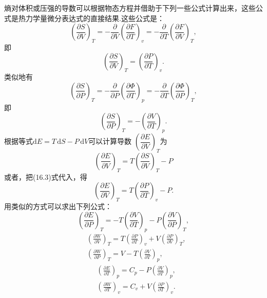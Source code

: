 熵对体积或压强的导数可以根据物态方程并借助于下列一些公式计算出来，这些公式是热力学量微分表达式的直接结果.这些公式是：
\begin{equation*}
  \left(\frac{\partial S}{\partial V}\right)_T
  =-\frac{\partial}{\partial V}
  \left(\frac{\partial F}{\partial T}\right)_v
  =-\frac{\partial}{\partial T}
  \left(\frac{\partial F}{\partial V}\right)_T,
\end{equation*}
即
\begin{equation}
  \left(\frac{\partial S}{\partial V}\right)_T
  =\left(\frac{\partial P}{\partial T}\right)_v.
\end{equation}
类似地有
\begin{equation*}
  \left(\frac{\partial S}{\partial P}\right)_T
  =-\frac{\partial}{\partial P}
  \left(\frac{\partial\varPhi}{\partial T}\right)_p
  =-\frac{\partial}{\partial T}
  \left(\frac{\partial\varPhi}{\partial P}\right)_T,
\end{equation*}
即
\begin{equation}
  \left(\frac{\partial S}{\partial P}\right)_T
  =-\left(\frac{\partial V}{\partial T}\right)_p.
\end{equation}
根据等式$\mathrm{d}E=T\,\mathrm{d}S-P\,\mathrm{d}V$可以计算导数
$\left(\dfrac{\partial E}{\partial V}\right)_T$为
\begin{equation*}
  \left(\frac{\partial E}{\partial V}\right)_T
  =T\left(\frac{\partial S}{\partial V}\right)_T-P
\end{equation*}
或者，把(16.3)式代入，得
\begin{equation}
  \left(\frac{\partial E}{\partial V}\right)_T
  =T\left(\frac{\partial P}{\partial T}\right)_v-P.
\end{equation}
用类似的方式可以求出下列公式：
\begin{equation}
  \left(\frac{\partial E}{\partial P}\right)_T
  =-T\left(\frac{\partial V}{\partial T}\right)_p
  -P\left(\frac{\partial V}{\partial P}\right)_T,
\end{equation}
\begin{equation}
\begin{aligned}
  &\left(\frac{\partial W}{\partial V}\right)_T
  =T\left(\frac{\partial P}{\partial T}\right)_v
  +V\left(\frac{\partial P}{\partial V}\right)_T,\\
  &\left(\frac{\partial W}{\partial P}\right)_T
  =V-T\left(\frac{\partial V}{\partial T}\right)_p,
\end{aligned}
\end{equation}
\begin{equation}
\begin{aligned}
  &\left(\frac{\partial E}{\partial T}\right)_p
  =C_p-P\left(\frac{\partial V}{\partial T}\right)_p,\\
  &\left(\frac{\partial W}{\partial T}\right)_v
  =C_v+V\left(\frac{\partial P}{\partial T}\right)_v.
\end{aligned}
\end{equation}
